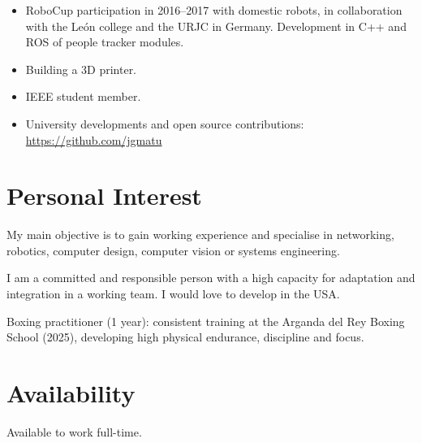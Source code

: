 \documentclass[11pt,a4paper]{article}
\begin{document}
\begin{itemize}
  \item RoboCup participation in 2016--2017 with domestic robots, in collaboration with the León college and the URJC in Germany. Development in C++ and ROS of people tracker modules.
  \item Building a 3D printer.
  \item IEEE student member.
  \item University developments and open source contributions: \url{https://github.com/jgmatu}
\end{itemize}

\section{Personal Interest}

My main objective is to gain working experience and specialise in networking, robotics, computer design, computer vision or systems engineering.

I am a committed and responsible person with a high capacity for adaptation and integration in a working team. I would love to develop in the USA.

Boxing practitioner (1 year): consistent training at the Arganda del Rey Boxing School (2025), developing high physical endurance, discipline and focus.

\section{Availability}

Available to work full-time.
\end{document}
